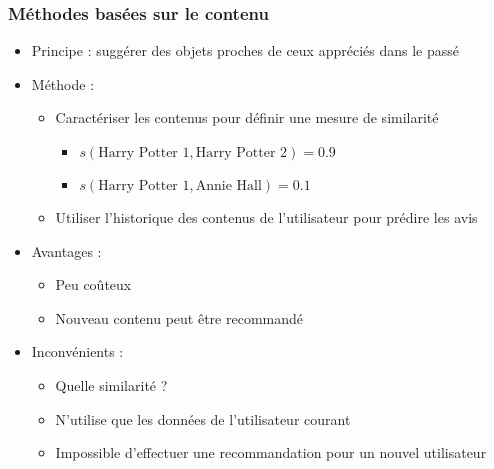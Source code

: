 \documentclass[c]{beamer}
\begin{document}
\begin{frame}
    \frametitle{M\'ethodes bas\'ees sur le contenu}

    \begin{itemize}
        \item Principe : sugg\'erer des objets proches de ceux appr\'eci\'es
            dans le pass\'e
        \item<2-> M\'ethode :
            \begin{itemize}
                \item Caract\'eriser les contenus pour d\'efinir une mesure de
                    similarit\'e
                    \begin{itemize}
                        \item $s(\text{Harry Potter 1}, \text{Harry Potter 2}) = 0.9$
                        \item $s(\text{Harry Potter 1}, \text{Annie Hall}) = 0.1$
                    \end{itemize}
                \item Utiliser l'historique des contenus de
                l'utilisateur pour pr\'edire les avis
            \end{itemize}
        \item<3-> Avantages :
            \begin{itemize}
                \item Peu coûteux
                \item Nouveau contenu peut être recommand\'e
            \end{itemize}
        \item<4-> Inconv\'enients :
            \begin{itemize}
                \item Quelle similarit\'e ?
                \item N'utilise que les donn\'ees de l'utilisateur courant
                \item Impossible d'effectuer une recommandation pour un
                    nouvel utilisateur
            \end{itemize}
    \end{itemize}
\end{frame}
\end{document}
